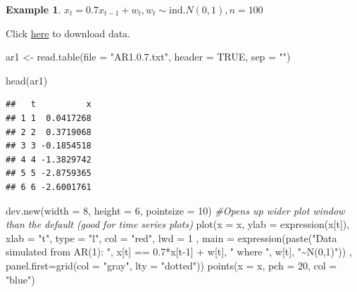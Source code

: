 \documentclass[
]{book}
\newenvironment{Shaded}{\begin{snugshade}}{\end{snugshade}}
\newcommand{\AttributeTok}[1]{\textcolor[rgb]{0.77,0.63,0.00}{#1}}
\newcommand{\CommentTok}[1]{\textcolor[rgb]{0.56,0.35,0.01}{\textit{#1}}}
\newcommand{\ConstantTok}[1]{\textcolor[rgb]{0.00,0.00,0.00}{#1}}
\newcommand{\DecValTok}[1]{\textcolor[rgb]{0.00,0.00,0.81}{#1}}
\newcommand{\FloatTok}[1]{\textcolor[rgb]{0.00,0.00,0.81}{#1}}
\newcommand{\FunctionTok}[1]{\textcolor[rgb]{0.00,0.00,0.00}{#1}}
\newcommand{\NormalTok}[1]{#1}
\newcommand{\OtherTok}[1]{\textcolor[rgb]{0.56,0.35,0.01}{#1}}
\newcommand{\SpecialCharTok}[1]{\textcolor[rgb]{0.00,0.00,0.00}{#1}}
\newcommand{\StringTok}[1]{\textcolor[rgb]{0.31,0.60,0.02}{#1}}
\theoremstyle{definition}
\theoremstyle{definition}
\newtheorem{example}{Example}[chapter]
\theoremstyle{definition}
\theoremstyle{definition}
\theoremstyle{remark}
\begin{document}
\begin{example}

\(x_t=0.7x_{t-1}+w_t, w_t\sim\mathrm{ind.}N(0,1), n=100\)

Click \href{http://www.chrisbilder.com/stat878/sections/2/AR1.0.7.txt}{here} to download data.

\begin{Shaded}
\begin{Highlighting}[]
\NormalTok{ar1 }\OtherTok{\textless{}{-}} \FunctionTok{read.table}\NormalTok{(}\AttributeTok{file =} \StringTok{"AR1.0.7.txt"}\NormalTok{, }\AttributeTok{header =} \ConstantTok{TRUE}\NormalTok{, }\AttributeTok{sep =} \StringTok{""}\NormalTok{)}

\FunctionTok{head}\NormalTok{(ar1)}
\end{Highlighting}
\end{Shaded}

\begin{verbatim}
##   t          x
## 1 1  0.0417268
## 2 2  0.3719068
## 3 3 -0.1854518
## 4 4 -1.3829742
## 5 5 -2.8759365
## 6 6 -2.6001761
\end{verbatim}

\begin{Shaded}
\end{Shaded}

\begin{Shaded}
\begin{Highlighting}[]
\FunctionTok{dev.new}\NormalTok{(}\AttributeTok{width =} \DecValTok{8}\NormalTok{, }\AttributeTok{height =} \DecValTok{6}\NormalTok{, }\AttributeTok{pointsize =} \DecValTok{10}\NormalTok{)  }
\CommentTok{\#Opens up wider plot window than the default (good for time series plots)}
\FunctionTok{plot}\NormalTok{(}\AttributeTok{x =}\NormalTok{ x, }\AttributeTok{ylab =} \FunctionTok{expression}\NormalTok{(x[t]), }\AttributeTok{xlab =} \StringTok{"t"}\NormalTok{, }\AttributeTok{type =} \StringTok{"l"}\NormalTok{, }\AttributeTok{col =} \StringTok{"red"}\NormalTok{, }\AttributeTok{lwd =} \DecValTok{1}\NormalTok{ , }
     \AttributeTok{main =} \FunctionTok{expression}\NormalTok{(}\FunctionTok{paste}\NormalTok{(}\StringTok{"Data simulated from AR(1): "}\NormalTok{, x[t] }\SpecialCharTok{==} \FloatTok{0.7}\SpecialCharTok{*}\NormalTok{x[t}\DecValTok{{-}1}\NormalTok{] }\SpecialCharTok{+}\NormalTok{ w[t], }\StringTok{" where "}\NormalTok{, w[t], }\StringTok{"\textasciitilde{}N(0,1)"}\NormalTok{)) , }
      \AttributeTok{panel.first=}\FunctionTok{grid}\NormalTok{(}\AttributeTok{col =} \StringTok{"gray"}\NormalTok{, }\AttributeTok{lty =} \StringTok{"dotted"}\NormalTok{))}
\FunctionTok{points}\NormalTok{(}\AttributeTok{x =}\NormalTok{ x, }\AttributeTok{pch =} \DecValTok{20}\NormalTok{, }\AttributeTok{col =} \StringTok{"blue"}\NormalTok{)}
\end{Highlighting}
\end{Shaded}


\end{example}
\end{document}
